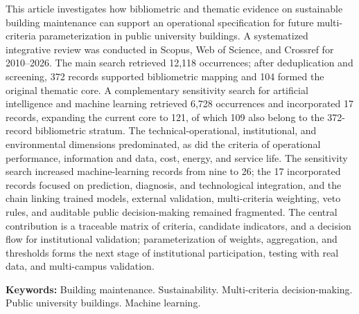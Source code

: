 \noindent This article investigates how bibliometric and thematic evidence on sustainable building maintenance can support an operational specification for future multi-criteria parameterization in public university buildings. A systematized integrative review was conducted in Scopus, Web of Science, and Crossref for 2010--2026. The main search retrieved 12,118 occurrences; after deduplication and screening, 372 records supported bibliometric mapping and 104 formed the original thematic core. A complementary sensitivity search for artificial intelligence and machine learning retrieved 6,728 occurrences and incorporated 17 records, expanding the current core to 121, of which 109 also belong to the 372-record bibliometric stratum. The technical-operational, institutional, and environmental dimensions predominated, as did the criteria of operational performance, information and data, cost, energy, and service life. The sensitivity search increased machine-learning records from nine to 26; the 17 incorporated records focused on prediction, diagnosis, and technological integration, and the chain linking trained models, external validation, multi-criteria weighting, veto rules, and auditable public decision-making remained fragmented. The central contribution is a traceable matrix of criteria, candidate indicators, and a decision flow for institutional validation; parameterization of weights, aggregation, and thresholds forms the next stage of institutional participation, testing with real data, and multi-campus validation.

\medskip
\noindent\textbf{Keywords:} Building maintenance. Sustainability. Multi-criteria decision-making. Public university buildings. Machine learning.

\bigskip